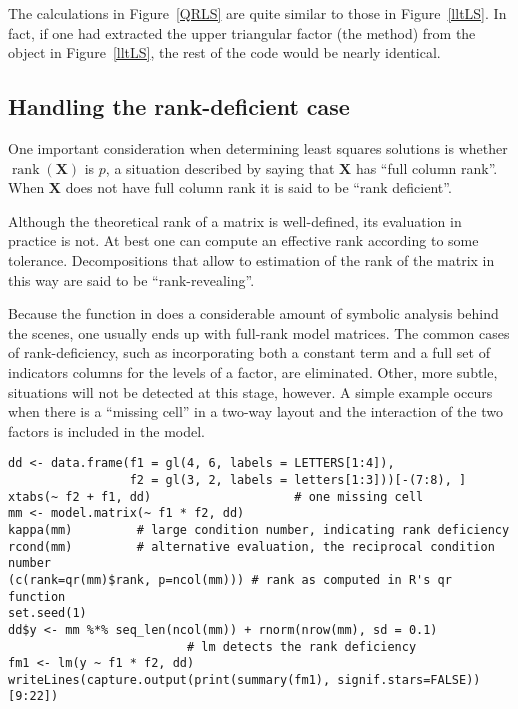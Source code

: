 \documentclass[shortnames,article]{jss}
\newcommand{\rank}{\operatorname{rank}}
\begin{document}
The calculations in Figure~\ref{QRLS} are quite similar to those in
Figure~\ref{lltLS}.  In fact, if one had extracted the upper
triangular factor (the  method) from the 
object in Figure~\ref{lltLS}, the rest of the code would be nearly
identical.


\subsection{Handling the rank-deficient case}
\label{sec:rankdeficient}

One important consideration when determining least squares solutions
is whether $\rank(\bm X)$ is $p$, a situation described by saying
that $\bm X$ has ``full column rank''.   When $\bm X$ does not have
full column rank it is said to be ``rank deficient''.

Although the theoretical rank of a matrix is well-defined, its
evaluation in practice is not.  At best one can compute an effective
rank according to some tolerance.  Decompositions that allow to
estimation of the rank of the matrix in this way are said to be
``rank-revealing''.

Because the  function in  does a
considerable amount of symbolic analysis behind the scenes, one usually
ends up with full-rank model matrices.  The common cases of
rank-deficiency, such as incorporating both a constant term and a full
set of indicators columns for the levels of a factor, are eliminated.
Other, more subtle, situations will not be detected at this stage,
however.  A simple example occurs when there is a ``missing cell'' in a
two-way layout and the interaction of the two factors is included in
the model.

\begin{verbatim}
dd <- data.frame(f1 = gl(4, 6, labels = LETTERS[1:4]),
                 f2 = gl(3, 2, labels = letters[1:3]))[-(7:8), ]
xtabs(~ f2 + f1, dd)                    # one missing cell
mm <- model.matrix(~ f1 * f2, dd)
kappa(mm)         # large condition number, indicating rank deficiency
rcond(mm)         # alternative evaluation, the reciprocal condition number
(c(rank=qr(mm)$rank, p=ncol(mm))) # rank as computed in R's qr function
set.seed(1)
dd$y <- mm %*% seq_len(ncol(mm)) + rnorm(nrow(mm), sd = 0.1)
                         # lm detects the rank deficiency
fm1 <- lm(y ~ f1 * f2, dd)
writeLines(capture.output(print(summary(fm1), signif.stars=FALSE))[9:22])
\end{verbatim}
\end{document}
